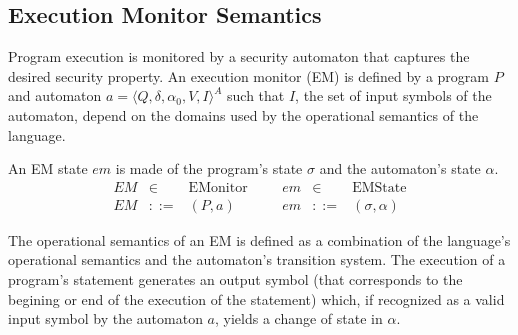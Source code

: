 \documentclass[10pt,notitlepage,twoside]{article}
\newcommand{\aut}{a}
\newcommand{\automata}[5]{\langle #1,#2,#3,#4,#5 \rangle^A}
\newcommand{\qu}{\alpha}
\newcommand{\theautomaton}{\automata{Q}{\delta}{\qu_0}{V}{I}}
\newcommand{\emdef}[2]{(#1,#2)}
\newtheorem{definition}{Definition}
\begin{document}
\begin{itemize}
\end{itemize}





\subsection{Execution Monitor Semantics}

Program execution is monitored by a security automaton that captures the desired security property. An execution monitor (EM) is defined by a program $P$ and automaton $\aut = \theautomaton$ such that $I$, the set of input symbols of the automaton, depend on the domains used by the operational semantics of the language.


An EM state $em$ is made of the program's state $\sigma$ and the automaton's state $\qu$. 
\begin{displaymath}
\begin{array}{rcl}
EM & \in & \mathrm{EMonitor} \\
EM & ::= & \emdef{P}{\aut}
\end{array} 
\;\;\;\;\;\;
\begin{array}{rcl}
em & \in & \mathrm{EMState} \\
em & ::= & (\sigma,\qu) 
\end{array} 
\end{displaymath}



The operational semantics of an EM is defined as a combination of the language's operational semantics and the automaton's transition system. The execution of a program's statement generates an output symbol (that corresponds to the begining or end of the execution of the statement) which, if recognized as a valid input symbol by the automaton $a$, yields a change of state in $\qu$.  
\end{document}
